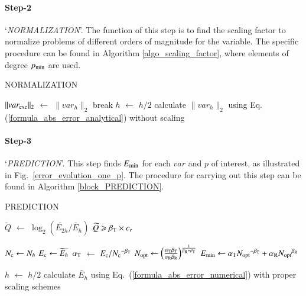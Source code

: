 \documentclass[review,3p]{elsarticle}
\begin{document}
\paragraph{Step-2} `\textit{NORMALIZATION}'. The function of this step is to find the scaling factor to normalize problems of different orders of magnitude for the variable. The specific procedure can be found in Algorithm \ref{algo_scaling_factor}, where elements of degree $p_{\rm min}$ are used. 

\vspace{0.2cm}
\begin{algorithm}[H]
\caption{NORMALIZATION}
\label{algo_scaling_factor}
{
    {
        $\|var_{\rm exc}\|_{2}$ $\gets$ $\|var_{h}\|_{2}$\;
        break\;
    }
    {
        $h$ $\gets$ $h/2$\;
        calculate $\|var_h\|_{2}$ using Eq. (\ref{formula_abs_error_analytical}) without scaling\;    
    }
}
\end{algorithm}
                                                                   
\paragraph{Step-3} `\textit{PREDICTION}'. This step finds $E_{\rm min}$ for each $var$ and $p$ of interest, as illustrated in Fig.~\ref{error_evolution_one_p}.
The procedure for carrying out this step can be found in Algorithm \ref{block_PREDICTION}.

\vspace{0.2cm}
\begin{algorithm}[H]
\caption{PREDICTION}			%
\label{block_PREDICTION}
    {
        $\widetilde{Q}$ $\gets$ $\log _2 \left( {\widetilde {E_{2h}}}/{\widetilde {E_{h}}} \right)$\;
        \eIf
        {
            $\widetilde{Q} \geqslant \beta_{\rm T} \times c_r$
        }
        {
            $N_{\rm c} \gets N_h$\;
            $E_{\rm c} \gets \widetilde {E_{h}}$\;
            $\alpha_{\rm T}$ $\gets$ ${E_{\rm c}}/{N_{\rm c}}^{- \beta_{\rm T}}$\;
            $N_{\rm opt} \gets \left( \frac{\alpha_{\rm T} \beta_{\rm T}}{\alpha _{\rm R} \beta_{\rm R}} \right)^{\frac{1}{\beta_{\rm R} + \beta_{\rm T}}}$\;
            $E_{\rm min} \gets \alpha_{\rm T} {N_{\rm opt}}^{- {\beta _{\rm T}}} + \alpha_{\rm R} {N_{\rm opt}}^{{\beta _{\rm R}}}$\;

        }
        {
            $h$ $\gets$ $h/2$\;
            calculate $\widetilde {E_{h}}$ using Eq.~(\ref{formula_abs_error_numerical}) with proper scaling schemes\;
        }
	}    
\end{algorithm}
\end{document}
